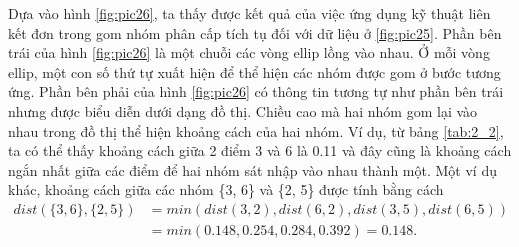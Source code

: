 Dựa vào hình \ref{fig:pic26}, ta thấy được kết quả của việc ứng dụng kỹ thuật liên kết đơn trong gom nhóm phân cấp tích tụ đối với dữ liệu ở \ref{fig:pic25}.
Phần bên trái của hình \ref{fig:pic26} là một chuỗi các vòng ellip lồng vào nhau.
Ở mỗi vòng ellip, một con số thứ tự xuất hiện để thể hiện các nhóm được gom ở bước tương ứng.
Phần bên phải của hình \ref{fig:pic26} có thông tin tương tự như phần bên trái nhưng được biểu diễn dưới dạng đồ thị.
Chiều cao mà hai nhóm gom lại vào nhau trong đồ thị thể hiện khoảng cách của hai nhóm.
Ví dụ, từ bảng \ref{tab:2_2}, ta có thể thấy khoảng cách giữa 2 điểm 3 và 6 là 0.11 và đây cũng là khoảng cách ngắn nhất giữa các điểm để hai nhóm sát nhập vào nhau thành một. 
Một ví dụ khác, khoảng cách giữa các nhóm \{3, 6\} và \{2, 5\} được tính  bằng cách
\begin{equation}
\begin{aligned}
dist(\{3, 6\}, \{2, 5\})
&= min(dist(3,2),dist(6, 2), dist(3, 5), dist(6, 5)) \\
&= min (0.148, 0.254, 0.284, 0.392) = 0.148. \\
\end{aligned}
\end{equation}


